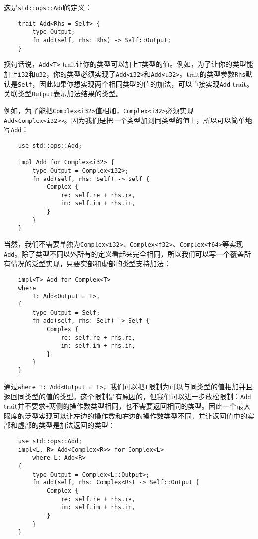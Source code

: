这是\texttt{std::ops::Add}的定义：
\begin{verbatim}
    trait Add<Rhs = Self> {
        type Output;
        fn add(self, rhs: Rhs) -> Self::Output;
    }
\end{verbatim}

换句话说，\texttt{Add<T>} trait让你的类型可以加上\texttt{T}类型的值。例如，为了让你的类型能加上\texttt{i32}和\texttt{u32}，你的类型必须实现了\texttt{Add<i32>}和\texttt{Add<u32>}。trait的类型参数\texttt{Rhs}默认是\texttt{Self}，因此如果你想实现两个相同类型的值的加法，可以直接实现\texttt{Add} trait。关联类型\texttt{Output}表示加法结果的类型。

例如，为了能把\texttt{Complex<i32>}值相加，\texttt{Complex<i32>}必须实现\texttt{Add<Complex<i32>>}。因为我们是把一个类型加到同类型的值上，所以可以简单地写\texttt{Add}：
\begin{verbatim}
    use std::ops::Add;

    impl Add for Complex<i32> {
        type Output = Complex<i32>;
        fn add(self, rhs: Self) -> Self {
            Complex {
                re: self.re + rhs.re,
                im: self.im + rhs.im,
            }
        }
    }
\end{verbatim}

当然，我们不需要单独为\texttt{Complex<i32>}、\texttt{Complex<f32>}、\texttt{Complex<f64>}等实现\texttt{Add}。除了类型不同以外所有的定义看起来完全相同，所以我们可以写一个覆盖所有情况的泛型实现，只要实部和虚部的类型支持加法：
\begin{verbatim}
    impl<T> Add for Complex<T>
    where
        T: Add<Output = T>,
    {
        type Output = Self;
        fn add(self, rhs: Self) -> Self {
            Complex {
                re: self.re + rhs.re,
                im: self.im + rhs.im,
            }
        }
    }
\end{verbatim}

通过\texttt{where T: Add<Output = T>}，我们可以把\texttt{T}限制为可以与同类型的值相加并且返回同类型的值的类型。这个限制是有原因的，但我们可以进一步放松限制：\texttt{Add} trait并不要求\texttt{+}两侧的操作数类型相同，也不需要返回相同的类型。因此一个最大限度的泛型实现可以让左边的操作数和右边的操作数类型不同，并让返回值中的实部和虚部的类型是加法返回的类型：
\begin{verbatim}
    use std::ops::Add;
    impl<L, R> Add<Complex<R>> for Complex<L>
        where L: Add<R>
    {
        type Output = Complex<L::Output>;
        fn add(self, rhs: Complex<R>) -> Self::Output {
            Complex {
                re: self.re + rhs.re,
                im: self.im + rhs.im,
            }
        }
    }
\end{verbatim}

